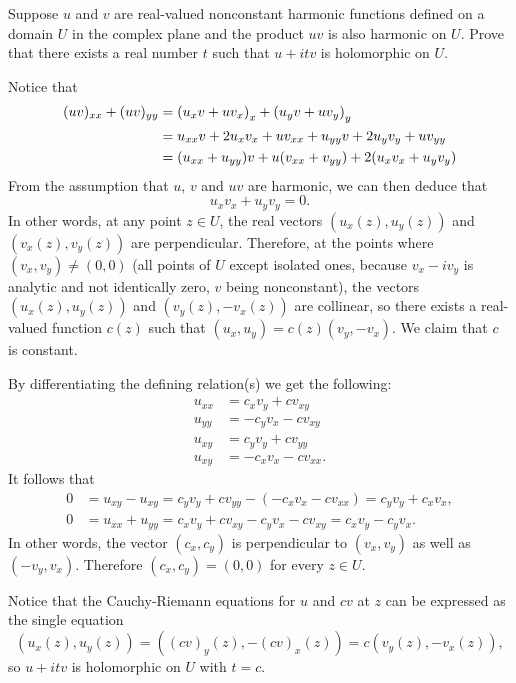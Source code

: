 \begin{problem}
Suppose $u$ and $v$ are real-valued nonconstant harmonic functions defined on a domain $U$ in the complex plane and the product $uv$ is also harmonic on $U$. Prove that there exists a real number $t$ such that $u + itv$ is holomorphic on $U$.
\begin{solution}
Notice that
\begin{align*}
    (uv)_{xx} + (uv)_{yy} &= \left( u_x v + u v_x\right)_x + \left( u_y v + u v_y\right)_y \\
    &= u_{xx} v + 2 u_x v_x + u v_{xx} + u_{yy} v + 2 u_y v_y + u v_{yy} \\
    &= (u_{xx} + u_{yy})v + u(v_{xx} + v_{yy}) + 2(u_x v_x + u_y v_y)
\end{align*}
From the assumption that $u$, $v$ and $uv$ are harmonic, we can then deduce that
$$ u_x v_x + u_y v_y = 0. $$
In other words, at any point $z \in U$, the real vectors $(u_x(z), u_y(z))$ and $(v_x(z), v_y(z))$ are perpendicular. Therefore, at the points where $(v_x, v_y) \neq (0,0)$ (all points of $U$ except isolated ones, because $v_x - iv_y$ is analytic and not identically zero, $v$ being nonconstant), the vectors $(u_x(z), u_y(z))$ and $(v_y(z), -v_x(z))$ are collinear, so there exists a real-valued function $c(z)$ such that $(u_x, u_y) = c(z) (v_y, -v_x)$. We claim that $c$ is constant.

By differentiating the defining relation(s) we get the following:
\begin{align*}
    u_{xx} &= c_x v_y + c v_{xy} \\
    u_{yy} &= -c_y v_x - c v_{xy} \\
    u_{xy} &= c_y v_y + c v_{yy} \\
    u_{xy} &= -c_x v_x - c v_{xx}.
\end{align*}
It follows that
\begin{align*}
    0 &= u_{xy} - u_{xy} = c_y v_y + c v_{yy} - (-c_x v_x - c v_{xx}) = c_y v_y + c_x v_x, \\
    0 &= u_{xx} + u_{yy} = c_x v_y + c v_{xy} - c_y v_x - c v_{xy} = c_x v_y - c_y v_x.
\end{align*}
In other words, the vector $(c_x, c_y)$ is perpendicular to $(v_x, v_y)$ as well as $(-v_y, v_x)$. Therefore $(c_x, c_y) = (0,0)$ for every $z \in U$.

Notice that the Cauchy-Riemann equations for $u$ and $cv$ at $z$ can be expressed as the single equation
$$ (u_x(z), u_y(z)) = ((cv)_y(z), -(cv)_x(z)) = c(v_y(z), -v_x(z)), $$
so $u + itv$ is holomorphic on $U$ with $t = c$.
\end{solution}
\end{problem}

